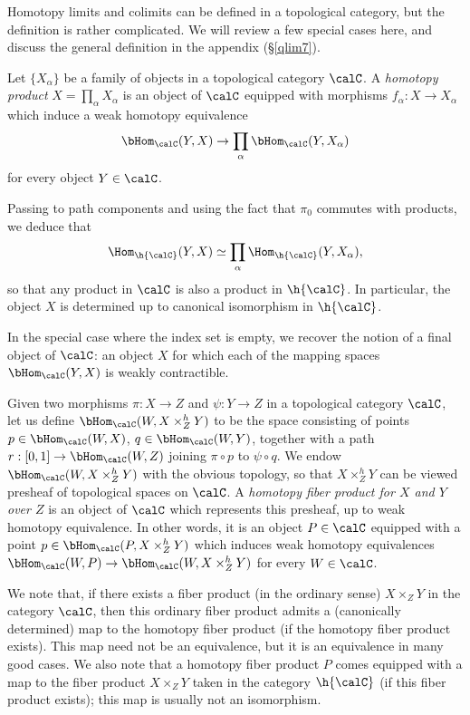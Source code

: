 Homotopy limits and
colimits can be defined in a topological category, but the
definition is rather complicated. We will review a few special cases here, and discuss the general definition in the appendix (\S \ref{qlim7}).

\begin{example}\label{examprod}
Let $\{ X_{\alpha} \}$ be a family of objects in a topological
category $\calC$. A {\it homotopy product} $X = \prod_{\alpha}
X_{\alpha}$ is an object of $\calC$ equipped with morphisms
$f_{\alpha}: X \rightarrow X_{\alpha}$ which induce a weak
homotopy equivalence
$$ \bHom_{\calC}(Y,X) \rightarrow \prod_{\alpha} \bHom_{\calC}(Y,
X_{\alpha})$$ for every object $Y \in \calC$.

Passing to path components and using the fact that $\pi_0$
commutes with products, we deduce that $$\Hom_{\h{\calC}}(Y,X) \simeq
\prod_{\alpha} \Hom_{\h{\calC}}(Y, X_{\alpha}),$$ so that any product in $\calC$ is
also a product in $\h{\calC}$. In particular, the object $X$ is
determined up to canonical isomorphism in $\h{\calC}$.

In the special case where the index set is empty, we recover the
notion of a final object of $\calC$: an object $X$ for which each
of the mapping spaces $\bHom_{\calC}(Y,X)$ is weakly contractible.
\end{example}

\begin{example}\label{exampull}
Given two morphisms $\pi: X \rightarrow Z$ and $\psi: Y \rightarrow Z$
in a topological category $\calC$, let us define $\bHom_{\calC}(W,
X \times^h_Z Y)$ to be the space consisting of points $p \in
\bHom_{\calC}(W,X)$, $q \in \bHom_{\calC}(W,Y)$, together with a path $r: [0,1]
\rightarrow \bHom_{\calC}(W,Z)$ joining $\pi \circ p$ to $\psi \circ q$. We
endow $\bHom_{\calC}(W, X \times^h_Z Y)$ with the obvious topology,
so that $X \times^h_Z Y$ can be viewed presheaf of topological spaces
on $\calC$. A {\it homotopy fiber product for $X$ and $Y$ over
$Z$} is an object of $\calC$ which represents this presheaf, up to
weak homotopy equivalence. In other words, it is an object $P \in \calC$
equipped with a point $p \in \bHom_{\calC}(P, X \times^h_Z Y)$ which
induces weak homotopy equivalences $\bHom_{\calC}(W,P) \rightarrow
\bHom_{\calC}(W, X \times^h_Z Y)$ for every $W \in \calC$.

We note that, if there exists a fiber product (in the ordinary sense) $X \times_Z Y$ in the category
$\calC$, then this ordinary fiber product admits a (canonically determined) map to the homotopy fiber product (if the homotopy fiber product exists). This map need not be an equivalence, but it is an equivalence in many good cases. We also note that a homotopy fiber product $P$ comes equipped with a map
to the fiber product $X \times_Z Y$ taken in the category $\h{\calC}$ (if this fiber product exists); this map is usually not an isomorphism.
\end{example}

